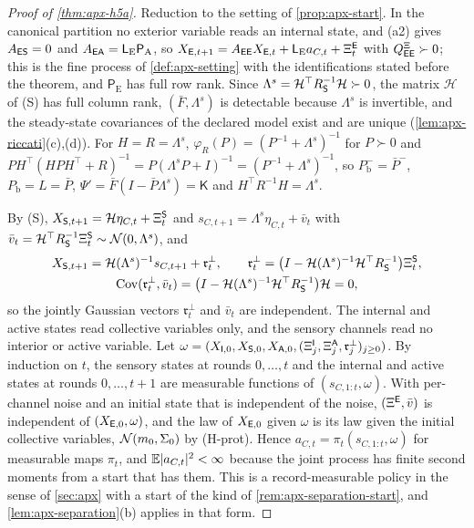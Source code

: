 \begin{proof}[Proof of \cref{thm:apx-h5a}]
Reduction to the setting of \cref{prop:apx-start}. In the canonical partition no exterior variable reads an internal state, and (a2) gives $A_{\mathsf{E}\mathsf{S}}=0$ and $A_{\mathsf{E}\mathsf{A}}=\mathsf L_{\mathrm E}\mathsf P_{\mathrm A}$, so $X_{\mathsf{E},t+1}=A_{\mathsf{E}\mathsf{E}}X_{\mathsf{E},t}+\mathsf L_{\mathrm E}a_{C,t}+\Xi^{\mathsf{E}}_t$ with $Q^{\Xi}_{\mathsf{E}\mathsf{E}}\succ0$; this is the fine process of \cref{def:apx-setting} with the identifications stated before the theorem, and $\mathsf P_{\mathrm E}$ has full row rank. Since $\Lambda^s=\mathcal H^\top R_{\mathsf{S}}^{-1}\mathcal H\succ0$, the matrix $\mathcal H$ of (S) has full column rank, $(\bar F,\Lambda^s)$ is detectable because $\Lambda^s$ is invertible, and the steady-state covariances of the declared model exist and are unique (\cref{lem:apx-riccati}(c),(d)). For $H=R=\Lambda^s$, $\varphi_R(P)=(P^{-1}+\Lambda^s)^{-1}$ for $P\succ0$ and $PH^\top(HPH^\top+R)^{-1}=P(\Lambda^sP+I)^{-1}=(P^{-1}+\Lambda^s)^{-1}$, so $P^-_{\mathrm b}=\bar P^-$, $P_{\mathrm b}=L=\bar P$, $\Psi'=\bar F(I-\bar P\Lambda^s)=\mathsf K$ and $H^\top R^{-1}H=\Lambda^s$.

By (S), $X_{\mathsf{S},t+1}=\mathcal H\eta_{C,t}+\Xi^{\mathsf{S}}_t$ and $s_{C,t+1}=\Lambda^s\eta_{C,t}+\bar v_t$ with $\bar v_t=\mathcal H^\top R_{\mathsf{S}}^{-1}\Xi^{\mathsf{S}}_t\sim\mathcal{N}(0,\Lambda^s)$, and
\begin{equation*}
\begin{gathered}
X_{\mathsf{S},t+1}=\mathcal H(\Lambda^s)^{-1}s_{C,t+1}+\mathfrak r^\perp_t,\qquad\mathfrak r^\perp_t=\bigl(I-\mathcal H(\Lambda^s)^{-1}\mathcal H^\top R_{\mathsf{S}}^{-1}\bigr)\Xi^{\mathsf{S}}_t,\\
\operatorname{Cov}(\mathfrak r^\perp_t,\bar v_t)=\bigl(I-\mathcal H(\Lambda^s)^{-1}\mathcal H^\top R_{\mathsf{S}}^{-1}\bigr)\mathcal H=0,
\end{gathered}
\end{equation*}
so the jointly Gaussian vectors $\mathfrak r^\perp_t$ and $\bar v_t$ are independent. The internal and active states read collective variables only, and the sensory channels read no interior or active variable. Let $\omega=(X_{\mathsf{I},0},X_{\mathsf{S},0},X_{\mathsf{A},0},(\Xi^{\mathsf{I}}_j,\Xi^{\mathsf{A}}_j,\mathfrak r^\perp_j)_{j\ge0})$. By induction on $t$, the sensory states at rounds $0,\dots,t$ and the internal and active states at rounds $0,\dots,t+1$ are measurable functions of $(s_{C,1:t},\omega)$. With per-channel noise and an initial state that is independent of the noise, $(\Xi^{\mathsf{E}},\bar v)$ is independent of $(X_{\mathsf{E},0},\omega)$, and the law of $X_{\mathsf{E},0}$ given $\omega$ is its law given the initial collective variables, $\mathcal{N}(m_0,\Sigma_0)$ by (H-prot). Hence $a_{C,t}=\pi_t(s_{C,1:t},\omega)$ for measurable maps $\pi_t$, and $\mathbb{E}\lvert a_{C,t}\rvert^2<\infty$ because the joint process has finite second moments from a start that has them. This is a record-measurable policy in the sense of \cref{sec:apx} with a start of the kind of \cref{rem:apx-separation-start}, and \cref{lem:apx-separation}(b) applies in that form.


\end{proof}
